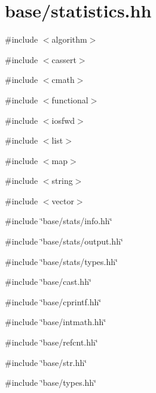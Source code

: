 \hypertarget{statistics_8hh}{
\section{base/statistics.hh}
\label{statistics_8hh}
}
{\ttfamily \#include $<$algorithm$>$}\par
{\ttfamily \#include $<$cassert$>$}\par
{\ttfamily \#include $<$cmath$>$}\par
{\ttfamily \#include $<$functional$>$}\par
{\ttfamily \#include $<$iosfwd$>$}\par
{\ttfamily \#include $<$list$>$}\par
{\ttfamily \#include $<$map$>$}\par
{\ttfamily \#include $<$string$>$}\par
{\ttfamily \#include $<$vector$>$}\par
{\ttfamily \#include \char`\"{}base/stats/info.hh\char`\"{}}\par
{\ttfamily \#include \char`\"{}base/stats/output.hh\char`\"{}}\par
{\ttfamily \#include \char`\"{}base/stats/types.hh\char`\"{}}\par
{\ttfamily \#include \char`\"{}base/cast.hh\char`\"{}}\par
{\ttfamily \#include \char`\"{}base/cprintf.hh\char`\"{}}\par
{\ttfamily \#include \char`\"{}base/intmath.hh\char`\"{}}\par
{\ttfamily \#include \char`\"{}base/refcnt.hh\char`\"{}}\par
{\ttfamily \#include \char`\"{}base/str.hh\char`\"{}}\par
{\ttfamily \#include \char`\"{}base/types.hh\char`\"{}}\par
